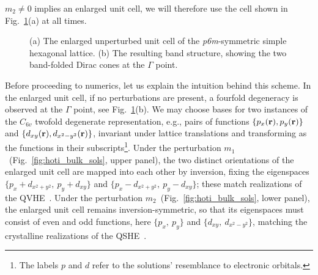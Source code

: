 $m_2 \neq 0$ implies an enlarged unit cell, we will therefore use the cell shown in Fig.~\ref{fig:hoti_folding}(a) at all times.
%
 \begin{figure} [h!]
 	\centering
 	
 	\caption{(a) The enlarged unperturbed unit cell of the \textit{p6m}-symmetric simple hexagonal lattice. (b) The resulting band structure, showing the two band-folded Dirac cones at the $\Gamma$ point.  }
 	\label{fig:hoti_folding}			
 \end{figure}
 
Before proceeding to numerics, let us explain the intuition behind this scheme. In the enlarged unit cell, if no perturbations are present, a fourfold degeneracy is observed at the $\Gamma$ point, see Fig.~\ref{fig:hoti_folding}(b). We may choose bases for two instances of the $C_{6v}$ twofold degenerate representation, e.g., pairs of functions $\{p_x(\vb{r}), p_y(\vb{r} )\}$ and $\{d_{xy}(\vb{r}), d_{x^2-y^2}(\vb{r})\}$, invariant under lattice translations and transforming as the functions in their subscripts\footnote{The labels $p$ and $d$ refer to the solutions' resemblance to electronic orbitals.}. Under the perturbation $m_1$~(Fig.~\ref{fig:hoti_bulk_sols}, upper panel), the two distinct orientations of the enlarged unit cell are mapped into each other by inversion, fixing the eigenspaces $\{p_x + d_{x^2+y^2}, \: p_y + d_{xy}\}$ and $\{p_x - d_{x^2+y^2}, \: p_y - d_{xy}\}$; these match realizations of the QVHE~\cite{Ma_2016, Lu_2017}. Under the perturbation $m_2$~(Fig.~\ref{fig:hoti_bulk_sols}, lower panel), the enlarged unit cell remains inversion-symmetric, so that its eigenspaces must consist of even and odd functions, here $\{p_x,\: p_y\}$ and $\{d_{xy},\: d_{x^2-y^2}\}$, matching the crystalline realizations of the QSHE~\cite{Wu_Hu_2015}. 

